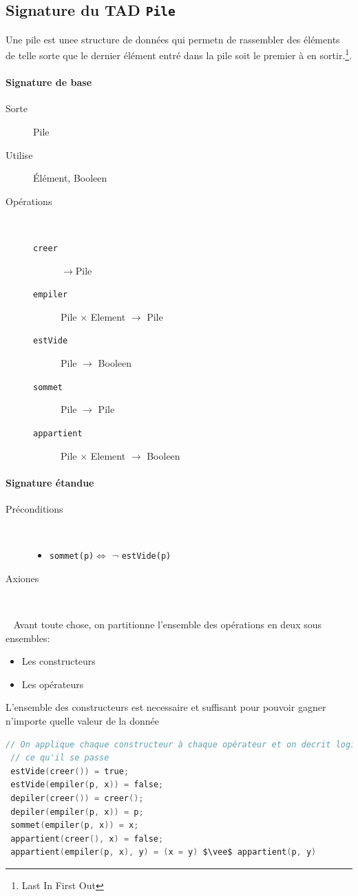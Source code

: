 \subsection{Signature du TAD \texttt{Pile}}
Une pile est unee structure de données qui permetn de rassembler des éléments de telle sorte que le dernier élément entré dans la pile soit le premier à
en sortir.\footnote{Last In First Out}.
\paragraph{Signature de base}
\begin{description}
	\item[Sorte] Pile
	\item[Utilise] Élément, Booleen 
	\item[Opérations]~ 
		\begin{description}
			\item[\texttt{creer}] $\rightarrow$Pile %
			\item[\texttt{empiler}] Pile $\times$ Element $\rightarrow$ Pile
			\item[\texttt{estVide}] Pile $\rightarrow$ Booleen  %
			\item[\texttt{sommet}] Pile $\rightarrow$ Pile
			\item[\texttt{appartient}] Pile $\times$ Element $\rightarrow$ Booleen 
		\end{description}
\end{description}

\paragraph{Signature étandue}
\begin{description}
	\item[Préconditions]~
		\begin{itemize}
			\item \texttt{sommet(p)}$\Leftrightarrow$ $\neg$ \texttt{estVide(p)}
		\end{itemize}
	\item[Axiones]~
\end{description}
~\newline
Avant toute chose, on partitionne l'ensemble des opérations en deux sous ensembles: 
\begin{itemize}
	\item Les constructeurs
	\item Les opérateurs
\end{itemize}
L'ensemble des constructeurs est necessaire et suffisant pour pouvoir gagner n'importe quelle valeur de la donnée
\begin{lstlisting}[language=C, numbers=none]
 // On applique chaque constructeur à chaque opérateur et on decrit logiquement 
 // ce qu'il se passe
 estVide(creer()) = true;
 estVide(empiler(p, x)) = false;
 depiler(creer()) = creer();
 depiler(empiler(p, x)) = p;
 sommet(empiler(p, x)) = x;
 appartient(creer(), x) = false;
 appartient(empiler(p, x), y) = (x = y) $\vee$ appartient(p, y)
 \end{lstlisting}

